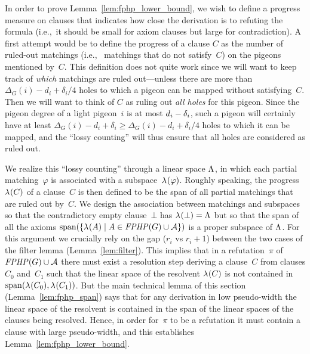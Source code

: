 \documentclass{article}
\newcommand{\set}[1]{\{ #1 \}}
\newcommand{\setdescr}[3][\mid]{\set{ #2 #1 #3 }}
\newcommand{\ie}{i.e.,\ }
\newcommand{\reflem}[1]{Lemma~\ref{#1}}
\newcommand{\refpi}{\pi}
\newcommand{\emptycl}{\bot}
\newcommand{\formulaformat}[1]{\mathit{#1}}
\newcommand{\graphfphpnot}[1][G]{\formulaformat{FPHP}({#1})}
\newcommand{\light}{light\xspace}
\newcommand{\GFPHP}{G\text{-}FPHP}
\renewcommand{\GFPHP}{\graphfphpnot[G]}
\renewcommand{\deg}[2][XXXXXXXXXXXX]{\Delta_{#1}(#2)}
\newcommand{\dimLi}{\deg[G]{i} - d_i + \delta_i/4}
\newcommand{\Ax}{\ensuremath\mathcal{A}}
\newcommand{\thr}[1]{ \ensuremath d_{{#1}} }
\newcommand{\adv}[1]{\delta_{{#1}}}
\newcommand{\linspace}[1][]{\ensuremath \Lambda_{{#1}}}
\newcommand{\linmap}[1][]{\ensuremath \lambda_{{#1}}}
\newcommand{\linmapof}[2][]{\linmap[#1](#2)}
\newcommand{\pseudowidth}{pseudo-width\xspace}
\newcommand{\matcha}{\varphi}
\newcommand{\spans}[1]{\mathrm{span} ( #1 )}
\numberwithin{equation}{section}
\begin{document}
In order to prove \reflem{lem:fphp_lower_bound}, we wish to define a
progress measure on clauses that indicates how close the derivation is
to refuting the formula (\ie it should be small for axiom clauses but
large for contradiction). A first attempt would be to define the
progress of a clause $C$ as the number of ruled-out matchings (\ie
matchings that do not satisfy~$C$) on the pigeons mentioned
by~$C$. This definition does not quite work since we will want to keep
track of \emph{which} matchings are ruled out---unless there are more
than~$\dimLi$ holes to which a pigeon can be mapped without
satisfying~$C$. Then we will want to think of $C$ as ruling out
\emph{all holes} for this pigeon. Since the pigeon degree of a \light
pigeon~$i$ is at most $\thr{i} - \adv{i}$, such a pigeon will
certainly have at least $ \deg[G]{i} - d_i + \delta_i \geq \dimLi$
holes to which it can be mapped, and the ``lossy counting'' will thus
ensure that all holes are considered as ruled out.

We realize this ``lossy counting'' through a linear space $\linspace$,
in which each partial matching~$\matcha$ is associated with a
subspace~$\linmapof{\matcha}$.  Roughly speaking, the
progress~$\linmapof{C}$ of a clause~$C$ is then defined to be the span
of all partial matchings that are ruled out by~$C$.  We design the
association between matchings and subspaces so that the contradictory
empty clause~$\emptycl$ has $\linmapof{\emptycl} = \linspace$ but so
that the span of all the axioms
$\spans{\setdescr{ \linmapof{A}}{A \in \GFPHP \cup \Ax}}$ is a proper
subspace of $\linspace$. For this argument we crucially rely on the
gap ($r_i$ vs $r_i + 1$) between the two cases of the filter lemma
(\reflem{lem:filter}). This implies that in a refutation~$\refpi$ of
$ \GFPHP \cup \Ax $ there must exist a resolution step deriving a
clause~$C$ from clauses $C_0$ and~$C_1$ such that the linear space of
the resolvent $\linmapof{C}$ is not contained in
$\spans{\linmapof{C_0}, \linmapof{C_1}}$.  But the main technical
lemma of this section (\reflem{lem:fphp_span}) says that for any
derivation in low \pseudowidth the linear space of the resolvent is
contained in the span of the linear spaces of the clauses being
resolved. Hence, in order for~$\refpi$ to be a refutation it must
contain a clause with large \pseudowidth, and this establishes
\reflem{lem:fphp_lower_bound}.
\end{document}
